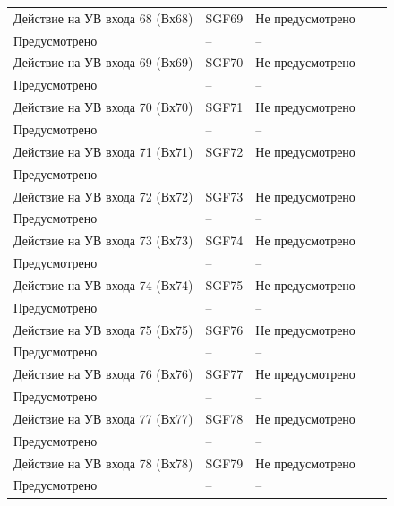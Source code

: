 \begin{longtable}{|>{\centering\arraybackslash}m{5.3cm}|>{\centering\arraybackslash}m{3.3cm}|>{\centering\arraybackslash}m{4.2cm}|>{\centering\arraybackslash}m{1.8cm}|>{\centering\arraybackslash}m{1cm}|}
\hline
\centering Действие на УВ входа 68 (Вх68)  & \centering SGF69 & \centering Не предусмотрено \\ Предусмотрено & \centering -- & \centering \arraybackslash -- \\
\hline
\centering Действие на УВ входа 69 (Вх69)  & \centering SGF70 & \centering Не предусмотрено \\ Предусмотрено & \centering -- & \centering \arraybackslash -- \\
\hline
\centering Действие на УВ входа 70 (Вх70)  & \centering SGF71 & \centering Не предусмотрено \\ Предусмотрено & \centering -- & \centering \arraybackslash -- \\
\hline
\centering Действие на УВ входа 71 (Вх71)  & \centering SGF72 & \centering Не предусмотрено \\ Предусмотрено & \centering -- & \centering \arraybackslash -- \\
\hline
\centering Действие на УВ входа 72 (Вх72)  & \centering SGF73 & \centering Не предусмотрено \\ Предусмотрено & \centering -- & \centering \arraybackslash -- \\
\hline
\centering Действие на УВ входа 73 (Вх73)  & \centering SGF74 & \centering Не предусмотрено \\ Предусмотрено & \centering -- & \centering \arraybackslash -- \\
\hline
\centering Действие на УВ входа 74 (Вх74)  & \centering SGF75 & \centering Не предусмотрено \\ Предусмотрено & \centering -- & \centering \arraybackslash -- \\
\hline
\centering Действие на УВ входа 75 (Вх75)  & \centering SGF76 & \centering Не предусмотрено \\ Предусмотрено & \centering -- & \centering \arraybackslash -- \\
\hline
\centering Действие на УВ входа 76 (Вх76)  & \centering SGF77 & \centering Не предусмотрено \\ Предусмотрено & \centering -- & \centering \arraybackslash -- \\
\hline
\centering Действие на УВ входа 77 (Вх77)  & \centering SGF78 & \centering Не предусмотрено \\ Предусмотрено & \centering -- & \centering \arraybackslash -- \\
\hline
\centering Действие на УВ входа 78 (Вх78)  & \centering SGF79 & \centering Не предусмотрено \\ Предусмотрено & \centering -- & \centering \arraybackslash -- \\

\end{longtable}
